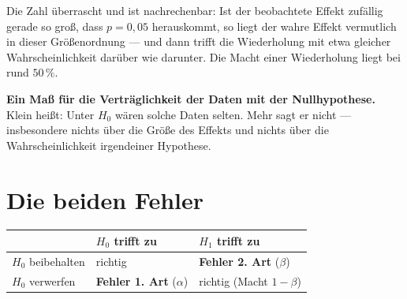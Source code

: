 \begin{warnung}
\begin{center}
\begin{minipage}{0.88\textwidth}
\end{minipage}
\end{center}

Die Zahl überrascht und ist nachrechenbar: Ist der beobachtete Effekt zufällig gerade so groß, dass $p = 0{,}05$ herauskommt, so liegt der wahre Effekt vermutlich in dieser Größenordnung --- und dann trifft die Wiederholung mit etwa gleicher Wahrscheinlichkeit darüber wie darunter. Die Macht einer Wiederholung liegt bei rund $50\,\%$.
\end{warnung}

\begin{merksatz}
\begin{center}
\begin{minipage}{0.9\textwidth}
\textbf{Ein Maß für die Verträglichkeit der Daten mit der Nullhypothese.} Klein heißt: Unter $H_0$ wären solche Daten selten. Mehr sagt er nicht --- insbesondere nichts über die Größe des Effekts und nichts über die Wahrscheinlichkeit irgendeiner Hypothese.
\end{minipage}
\end{center}
\end{merksatz}

\section{Die beiden Fehler}

\begin{definition}
\begin{center}
{\small
\renewcommand{\arraystretch}{1.6}
\begin{tabular}{@{}P{2.4cm}P{2.8cm}P{2.8cm}@{}}
\toprule
& \textbf{$H_0$ trifft zu} & \textbf{$H_1$ trifft zu}\\
\midrule
$H_0$ beibehalten & \textcolor{gruen}{richtig} & \textcolor{akzent}{\textbf{Fehler 2. Art}} ($\beta$)\\
$H_0$ verwerfen & \textcolor{akzent}{\textbf{Fehler 1. Art}} ($\alpha$) & \textcolor{gruen}{richtig} (Macht $1-\beta$)\\
\bottomrule
\end{tabular}}
\end{center}
\end{definition}

